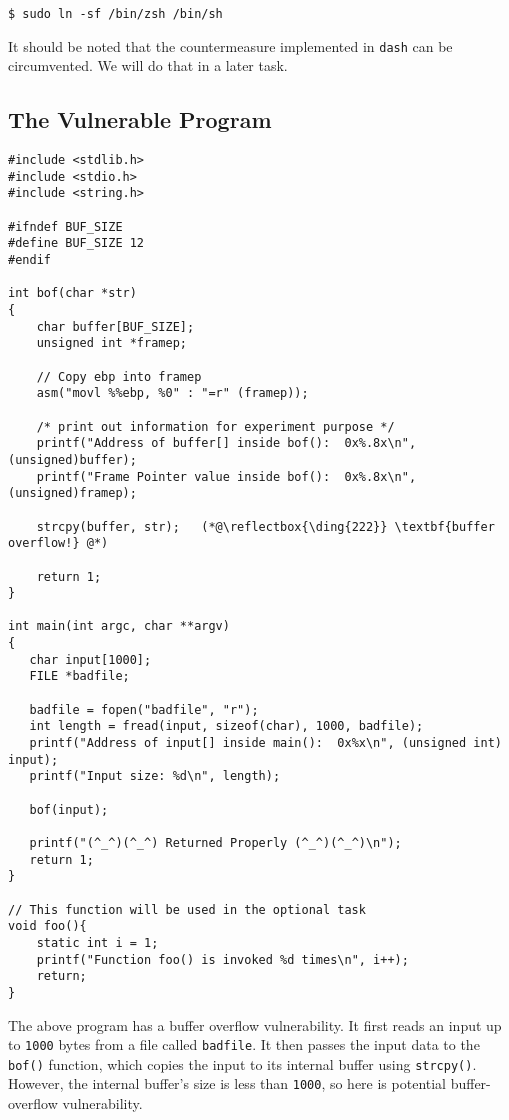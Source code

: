 \begin{lstlisting}
$ sudo ln -sf /bin/zsh /bin/sh
\end{lstlisting}


It should be noted that the countermeasure implemented in
\texttt{dash} can be circumvented. We will 
do that in a later task. 



\subsection{The Vulnerable Program}
\label{sec:vulnerable_program}

\begin{lstlisting}[caption={The vulnerable program (\texttt{retlib.c})}]
#include <stdlib.h>
#include <stdio.h>
#include <string.h>

#ifndef BUF_SIZE
#define BUF_SIZE 12
#endif

int bof(char *str)
{
    char buffer[BUF_SIZE];
    unsigned int *framep;

    // Copy ebp into framep
    asm("movl %%ebp, %0" : "=r" (framep));      

    /* print out information for experiment purpose */
    printf("Address of buffer[] inside bof():  0x%.8x\n", (unsigned)buffer);
    printf("Frame Pointer value inside bof():  0x%.8x\n", (unsigned)framep);

    strcpy(buffer, str);   (*@\reflectbox{\ding{222}} \textbf{buffer overflow!} @*)

    return 1;
}

int main(int argc, char **argv)
{
   char input[1000];
   FILE *badfile;

   badfile = fopen("badfile", "r");
   int length = fread(input, sizeof(char), 1000, badfile);
   printf("Address of input[] inside main():  0x%x\n", (unsigned int) input);
   printf("Input size: %d\n", length);

   bof(input);

   printf("(^_^)(^_^) Returned Properly (^_^)(^_^)\n");
   return 1;
}

// This function will be used in the optional task
void foo(){
    static int i = 1;
    printf("Function foo() is invoked %d times\n", i++);
    return;
}
\end{lstlisting}

The above program has a buffer overflow vulnerability. It first reads
an input up to \texttt{1000} bytes from a file called \texttt{badfile}. 
It then passes the input data to the \texttt{bof()} function, which
copies the input to its internal buffer using \texttt{strcpy()}. 
However, the internal buffer's size is less than \texttt{1000},
so here is potential buffer-overflow vulnerability.

